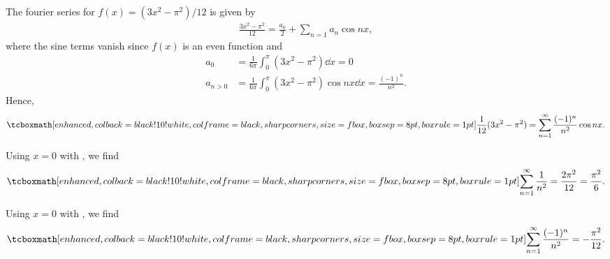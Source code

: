 
The fourier series for $f(x) = (3x^2 - \pi^2)/12$ is given by
\begin{eqnarray}
    \label{eq:fourier-series-5}
    \frac{3x^2 - \pi^2}{12} = \frac{a_0}{2} + \sum_{n=1} a_{n}\cos{nx} 
,\end{eqnarray}
where the sine terms vanish since $f(x)$ is an even function and
\begin{align}
    \label{eq:an-coeffs-5}
    a_{0} &= \frac{1}{6\pi} \int_{0}^{\pi} (3x^2 - \pi^2) \dd{x} = 0 \\
    a_{n>0} &= \frac{1}{6\pi} \int_{0}^{\pi} (3x^2 - \pi^2) \cos{nx} \dd{x} = \frac{(-1)^{n}}{n^2}
.\end{align}
Hence,
\begin{eqnarray}
    \label{eq:result-5}
    \eqbox{
    \frac{1}{12}(3x^2 - \pi^2) = \sum_{n=1}^{\infty} \frac{(-1)^{n}}{n^2} \cos{nx}
}
.\end{eqnarray}



Using $x = 0$ with , we find
\begin{eqnarray}
    \label{eq:id-6}
    \eqbox{
    \sum_{n=1}^{\infty} \frac{1}{n^2} = \frac{2\pi^2}{12} = \frac{\pi^2}{6} 
}
.\end{eqnarray}



Using $x = 0$ with , we find
\begin{eqnarray}
    \label{eq:id-7}
    \eqbox{
    \sum_{n=1}^{\infty} \frac{(-1)^{n}}{n^2} = -\frac{\pi^2}{12}
}
.\end{eqnarray}




